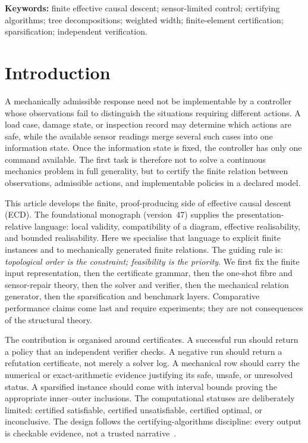 \documentclass[11pt]{article}
\theoremstyle{plain}
\theoremstyle{definition}
\theoremstyle{remark}
\begin{document}
\noindent\textbf{Keywords:} finite effective causal descent; sensor-limited control;
certifying algorithms; tree decompositions; weighted width; finite-element
certification; sparsification; independent verification.

\tableofcontents

\section{Introduction}
\label{sec:introduction}

A mechanically admissible response need not be implementable by a controller
whose observations fail to distinguish the situations requiring different
actions.  A load case, damage state, or inspection record may determine which
actions are safe, while the available sensor readings merge several such cases
into one information state.  Once the information state is fixed, the controller
has only one command available.  The first task is therefore not to solve a
continuous mechanics problem in full generality, but to certify the finite
relation between observations, admissible actions, and implementable policies in
a declared model.

This article develops the finite, proof-producing side of effective causal
descent (ECD).  The foundational monograph (version~47) supplies the presentation-relative
language: local validity, compatibility of a diagram, effective realisability,
and bounded realisability.  Here we specialise that language to explicit finite
instances and to mechanically generated finite relations.  The guiding rule is:
\emph{topological order is the constraint; feasibility is the priority}.  We
first fix the finite input representation, then the certificate grammar, then
the one-shot fibre and sensor-repair theory, then the solver and verifier,
then the mechanical relation generator, then the sparsification and benchmark
layers.  Comparative performance claims come last
and require experiments; they are not consequences of the structural theory.

The contribution is organised around certificates.  A successful run should
return a policy that an independent verifier checks.  A negative run should
return a refutation certificate, not merely a solver log.  A mechanical row
should carry the numerical or exact-arithmetic evidence justifying its safe,
unsafe, or unresolved status.  A sparsified instance should come with interval
bounds proving the appropriate inner--outer inclusions.  The computational
statuses are deliberately limited: certified satisfiable, certified
unsatisfiable, certified optimal, or inconclusive.  The design follows the
certifying-algorithms discipline: every output is checkable evidence, not a
trusted narrative~\cite{mcm11}.
\end{document}
